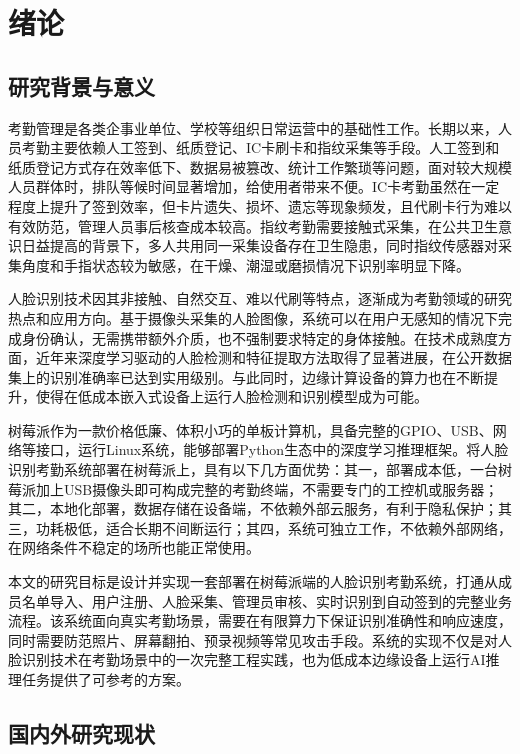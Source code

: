 \chapter{绪论}

\section{研究背景与意义}

考勤管理是各类企事业单位、学校等组织日常运营中的基础性工作。长期以来，人员考勤主要依赖人工签到、纸质登记、IC卡刷卡和指纹采集等手段。人工签到和纸质登记方式存在效率低下、数据易被篡改、统计工作繁琐等问题，面对较大规模人员群体时，排队等候时间显著增加，给使用者带来不便。IC卡考勤虽然在一定程度上提升了签到效率，但卡片遗失、损坏、遗忘等现象频发，且代刷卡行为难以有效防范，管理人员事后核查成本较高。指纹考勤需要接触式采集，在公共卫生意识日益提高的背景下，多人共用同一采集设备存在卫生隐患，同时指纹传感器对采集角度和手指状态较为敏感，在干燥、潮湿或磨损情况下识别率明显下降。

人脸识别技术因其非接触、自然交互、难以代刷等特点，逐渐成为考勤领域的研究热点和应用方向。基于摄像头采集的人脸图像，系统可以在用户无感知的情况下完成身份确认，无需携带额外介质，也不强制要求特定的身体接触。在技术成熟度方面，近年来深度学习驱动的人脸检测和特征提取方法取得了显著进展，在公开数据集上的识别准确率已达到实用级别。与此同时，边缘计算设备的算力也在不断提升，使得在低成本嵌入式设备上运行人脸检测和识别模型成为可能。

树莓派作为一款价格低廉、体积小巧的单板计算机，具备完整的GPIO、USB、网络等接口，运行Linux系统，能够部署Python生态中的深度学习推理框架。将人脸识别考勤系统部署在树莓派上，具有以下几方面优势：其一，部署成本低，一台树莓派加上USB摄像头即可构成完整的考勤终端，不需要专门的工控机或服务器；其二，本地化部署，数据存储在设备端，不依赖外部云服务，有利于隐私保护；其三，功耗极低，适合长期不间断运行；其四，系统可独立工作，不依赖外部网络，在网络条件不稳定的场所也能正常使用。

本文的研究目标是设计并实现一套部署在树莓派端的人脸识别考勤系统，打通从成员名单导入、用户注册、人脸采集、管理员审核、实时识别到自动签到的完整业务流程。该系统面向真实考勤场景，需要在有限算力下保证识别准确性和响应速度，同时需要防范照片、屏幕翻拍、预录视频等常见攻击手段。系统的实现不仅是对人脸识别技术在考勤场景中的一次完整工程实践，也为低成本边缘设备上运行AI推理任务提供了可参考的方案。

\section{国内外研究现状}

